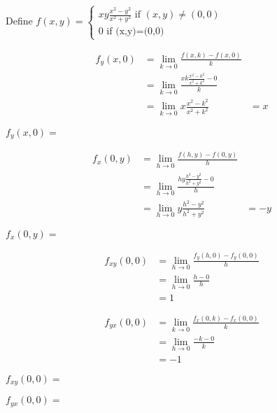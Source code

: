 \documentclass{ximera}
\begin{document}
	\begin{question}
		Define \(f(x,y) = \begin{cases} 
				xy\frac{x^2-y^2}{x^2+y^2} \text{ if $(x,y) \neq (0,0)$}\\
				0 \text{ if (x,y)=(0,0)}
				\end{cases}\)
		\begin{solution}
			
			\begin{hint}
				\begin{question}
					\begin{solution}
						\begin{hint}
							\begin{align*}
							f_y(x,0) &=  \displaystyle\lim_{k \to 0} \frac{f(x,k)-f(x,0)}{k}\\
								&= \displaystyle\lim_{k \to 0} \frac{xk\frac{x^2-k^2}{x^2+k^2} - 0}{k}\\
								&=\displaystyle\lim_{k \to 0} x\frac{x^2-k^2}{x^2+k^2}
								&=x
							\end{align*}
						\end{hint}
						$f_y(x,0) = $
					\end{solution}
					\begin{solution}
						\begin{hint}
							\begin{align*}
							f_x(0,y) &=  \displaystyle\lim_{h \to 0} \frac{f(h,y)-f(0,y)}{h}\\
								&= \displaystyle\lim_{h \to 0} \frac{hy\frac{h^2-y^2}{h^2+y^2} - 0}{h}\\
								&=\displaystyle\lim_{h \to 0} y\frac{h^2-y^2}{h^2+y^2}
								&=-y
							\end{align*}
						\end{hint}
						$f_x(0,y) = $\answer{$-y$}
					\end{solution}
				\end{question}
			\end{hint}
			\begin{hint}
				\begin{align*}
					f_{xy}(0,0) &= \displaystyle\lim_{h \to 0} \frac{f_y(h,0) - f_y(0,0)}{h}\\
						&=\displaystyle\lim_{h \to 0} \frac{h -0}{h}\\
						&=1
				\end{align*}
			\end{hint}
			\begin{hint}
				\begin{align*}
					f_{yx}(0,0) &= \displaystyle\lim_{k \to 0} \frac{f_x(0,k) - f_x(0,0)}{k}\\
						&=\displaystyle\lim_{h \to 0} \frac{-k -0}{k}\\
						&=-1
				\end{align*}
			\end{hint}
			
			$f_{xy}(0,0)=$\answer{$1$}
		\end{solution}
		\begin{solution}
			$f_{yx}(0,0)=$\answer{$-1$}
		\end{solution}
	\end{question}
	
	
	
\end{document}
